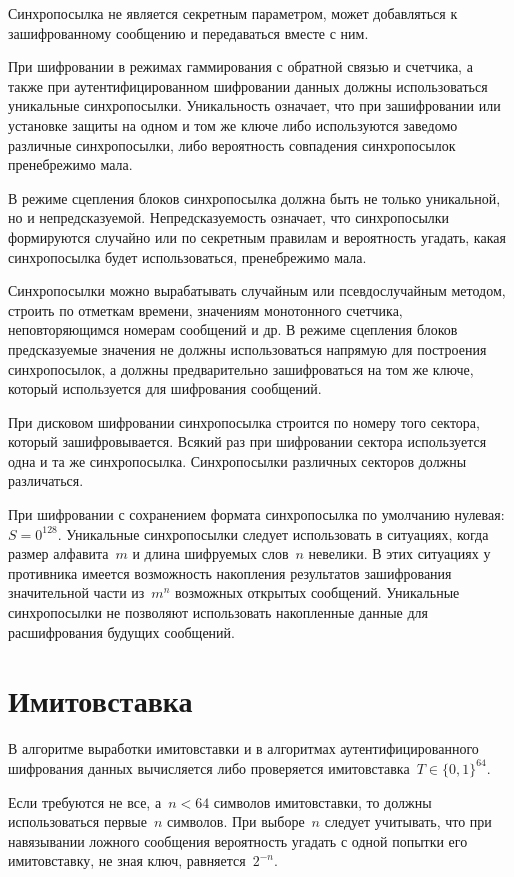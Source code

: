 Синхропосылка не является секретным параметром, 
может добавляться к зашифрованному сообщению и передаваться вместе с ним.

При шифровании в режимах гаммирования с обратной связью и счетчика, 
а также при аутентифицированном шифровании данных должны использоваться 
уникальные синхропосылки.
%
Уникальность означает, что при зашифровании или установке защиты 
на одном и том же ключе либо используются заведомо различные синхропосылки,
либо вероятность совпадения синхропосылок пренебрежимо мала.

В режиме сцепления блоков синхропосылка должна быть не только 
уникальной, но и непредсказуемой.
%
Непредсказуемость означает, что синхропосылки формируются случайно
или по секретным правилам и вероятность угадать, 
какая синхропосылка будет использоваться, пренебрежимо мала.

Синхропосылки можно вырабатывать случайным или псевдослучайным 
методом, строить по отметкам времени, значениям монотонного счетчика, 
неповторяющимся номерам сообщений и др.
%
В режиме сцепления блоков предсказуемые значения не должны
использоваться напрямую для построения синхропосылок, 
а должны предварительно зашифроваться на том же ключе, 
который используется для шифрования сообщений.

При дисковом шифровании синхропосылка строится по номеру того 
сектора, который зашифровывается. Всякий раз при шифровании сектора 
используется одна и та же синхропосылка. Синхропосылки различных секторов 
должны различаться.

При шифровании с сохранением формата синхропосылка по умолчанию 
нулевая: $S=0^{128}$.
%
Уникальные синхропосылки следует использовать в ситуациях,
когда размер алфавита~$m$ и длина шифруемых слов~$n$ невелики.
%
В этих ситуациях у противника имеется возможность накопления 
результатов зашифрования значительной части из~$m^n$ возможных открытых 
сообщений. 
%
Уникальные синхропосылки не позволяют использовать накопленные 
данные для расшифрования будущих сообщений.

\section{Имитовставка}\label{COMMON.MAC}

В алгоритме выработки имитовставки и в алгоритмах аутентифицированного шифрования
данных вычисляется либо проверяется имитовставка~$T\in\{0,1\}^{64}$.

Если требуются не все, а~$n<64$ символов имитовставки, 
то должны использоваться первые~$n$ символов.
%
При выборе~$n$ следует учитывать, что при навязывании ложного сообщения 
вероятность угадать с одной попытки его имитовставку, не зная ключ,
равняется~$2^{-n}$.

